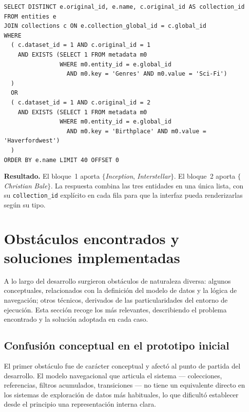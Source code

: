 \begin{lstlisting}[style=sqlStyle, label=lst:flujo3, caption={[SQL del Flujo~3]SQL emitida por \texttt{getUnionEntities} con dos contextos de colecciones distintas en el \texttt{unionSet}.}]
SELECT DISTINCT e.original_id, e.name, c.original_id AS collection_id
FROM entities e
JOIN collections c ON e.collection_global_id = c.global_id
WHERE
  ( c.dataset_id = 1 AND c.original_id = 1
    AND EXISTS (SELECT 1 FROM metadata m0
                WHERE m0.entity_id = e.global_id
                  AND m0.key = 'Genres' AND m0.value = 'Sci-Fi')
  )
  OR
  ( c.dataset_id = 1 AND c.original_id = 2
    AND EXISTS (SELECT 1 FROM metadata m0
                WHERE m0.entity_id = e.global_id
                  AND m0.key = 'Birthplace' AND m0.value = 'Haverfordwest')
  )
ORDER BY e.name LIMIT 40 OFFSET 0
\end{lstlisting}

\textbf{Resultado.} El bloque~1 aporta $\{$\textit{Inception},
\textit{Interstellar}$\}$. El bloque~2 aporta $\{$\textit{Christian Bale}$\}$. 
La respuesta combina las tres entidades en una única lista,
con su \texttt{collection\_id} explícito en cada fila para que la
interfaz pueda renderizarlas según su tipo. 

\FloatBarrier
\fussy
{}

\section{Obstáculos encontrados y soluciones implementadas}
\label{sec:obstaculos}

A lo largo del desarrollo surgieron obstáculos de naturaleza diversa: algunos conceptuales,
relacionados con la definición del modelo de datos y la lógica de navegación; otros técnicos,
derivados de las particularidades del entorno de ejecución. Esta sección recoge los más
relevantes, describiendo el problema encontrado y la solución adoptada en cada caso.

    \subsection*{Confusión conceptual en el prototipo inicial}

El primer obstáculo fue de carácter conceptual y afectó al punto de partida del desarrollo.
El modelo navegacional que articula el sistema --- colecciones, referencias, filtros
acumulados, transiciones --- no tiene un equivalente directo en los sistemas de exploración
de datos más habituales, lo que dificultó establecer desde el principio una representación
interna clara.

